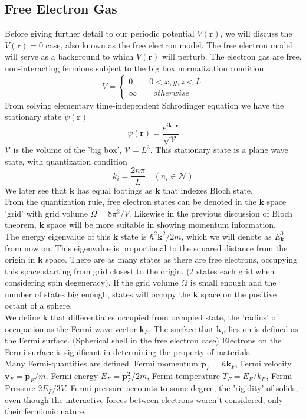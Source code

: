 \documentclass{article}
\begin{document}
\subsection*{Free Electron Gas}
Before giving further detail to our periodic potential $V(\mathbf{r})$, we will discuss the $V(\mathbf{r})=0$ case, also known as the free electron model. The free electron model will serve as a background to which $V(\mathbf{r})$ will perturb. The electron gas are free, non-interacting fermions subject to the big box normalization condition
$$V=\begin{cases}
		0\qquad 0<x,y,z<L \\
		\infty \qquad otherwise
	\end{cases}$$
From solving elementary time-independent Schrodinger equation we have the stationary state $\psi(\mathbf{r})$
$$\psi(\mathbf{r})=\frac{e^{i \mathbf{k}\cdot\mathbf{r}}}{\sqrt{\mathcal{V}}}$$
$\mathcal{V}$ is the volume of the 'big box', $\mathcal{V}=L^3$. This stationary state is a plane wave state, with quantization condition
$$k_{i}=\frac{2n\pi}{L}\quad (n_i\in \mathcal{N})$$
We later see that $\mathbf{k}$ has equal footings as $\mathbf{k}$ that indexes Bloch state.\\
From the quantization rule, free electron states can be denoted in the $\mathbf{k}$ space 'grid' with grid volume $\Omega=8\pi^{3}/V$. Likewise in the previous discussion of Bloch theorem, $\mathbf{k}$ space will be more suitable in showing momentum information.\\
The energy eigenvalue of this $\mathbf{k}$ state is $\hbar^2\mathbf{k}^2/2m$, which we will denote as $E_\mathbf{k}^0$ from now on. This eigenvalue is proportional to the squared distance from the origin in $\mathbf{k}$ space. There are as many states as there are free electrons, occupying this space starting from grid closest to the origin. (2 states each grid when considering spin degeneracy). If the grid volume $\Omega$ is small enough and the number of states big enough, states will occupy the $\mathbf{k}$ space on the positive octant of a sphere.\\
We define $\mathbf{k}$ that differentiates occupied from occupied state, the 'radius' of occupation as the Fermi wave vector $\mathbf{k}_F$. The surface that $\mathbf{k}_F$ lies on is defined as the Fermi surface. (Spherical shell in the free electron case) Electrons on the Fermi surface is significant in determining the property of materials. \\
Many Fermi-quantities are defined. Fermi momentum $\mathbf{p}_F=\hbar\mathbf{k}_F$, Fermi velocity $\mathbf{v}_F=\mathbf{p}_F/m$, Fermi energy $E_F=\mathbf{p}_F^2/2m$, Fermi temperature $T_F=E_F/k_B$, Fermi Pressure $2E_F/3V$. Fermi pressure accounts to some degree, the 'rigidity' of solids, even though the interactive forces between electrons weren't considered, only their fermionic nature.\\
\end{document}
